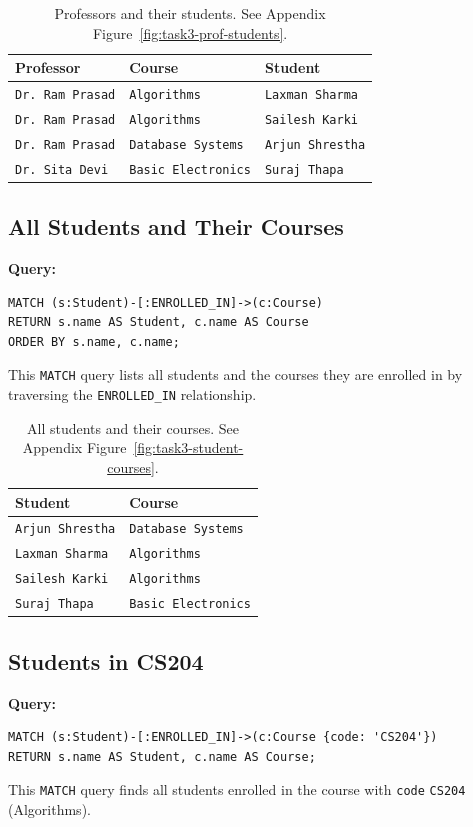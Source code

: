 \begin{table}[H]
  \centering
  \caption{Professors and their students. See Appendix Figure~\ref{fig:task3-prof-students}.}
  \begin{tabular}{|l|l|l|}
    \hline
    \textbf{Professor} & \textbf{Course} & \textbf{Student} \\
    \hline
    \texttt{Dr. Ram Prasad} & \texttt{Algorithms} & \texttt{Laxman Sharma} \\
    \texttt{Dr. Ram Prasad} & \texttt{Algorithms} & \texttt{Sailesh Karki} \\
    \texttt{Dr. Ram Prasad} & \texttt{Database Systems} & \texttt{Arjun Shrestha} \\
    \texttt{Dr. Sita Devi} & \texttt{Basic Electronics} & \texttt{Suraj Thapa} \\
    \hline
  \end{tabular}
\end{table}

\subsection{All Students and Their Courses}
\textbf{Query:}
\begin{verbatim}
MATCH (s:Student)-[:ENROLLED_IN]->(c:Course)
RETURN s.name AS Student, c.name AS Course
ORDER BY s.name, c.name;
\end{verbatim}
This \texttt{MATCH} query lists all students and the courses they are enrolled in by traversing the \texttt{ENROLLED\_IN} relationship.

\begin{table}[H]
  \centering
  \caption{All students and their courses. See Appendix Figure~\ref{fig:task3-student-courses}.}
  \begin{tabular}{|l|l|}
    \hline
    \textbf{Student} & \textbf{Course} \\
    \hline
    \texttt{Arjun Shrestha} & \texttt{Database Systems} \\
    \texttt{Laxman Sharma} & \texttt{Algorithms} \\
    \texttt{Sailesh Karki} & \texttt{Algorithms} \\
    \texttt{Suraj Thapa} & \texttt{Basic Electronics} \\
    \hline
  \end{tabular}
\end{table}

\subsection{Students in CS204}
\textbf{Query:}
\begin{verbatim}
MATCH (s:Student)-[:ENROLLED_IN]->(c:Course {code: 'CS204'})
RETURN s.name AS Student, c.name AS Course;
\end{verbatim}
This \texttt{MATCH} query finds all students enrolled in the course with \texttt{code} \texttt{CS204} (Algorithms).

